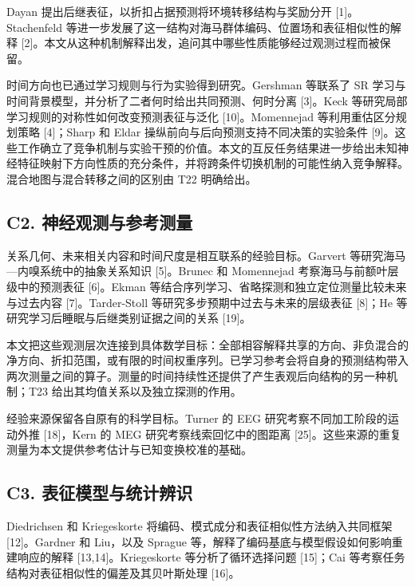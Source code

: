 \documentclass[11pt,a4paper]{article}
\begin{document}
Dayan 提出后继表征，以折扣占据预测将环境转移结构与奖励分开
{[}1{]}。Stachenfeld
等进一步发展了这一结构对海马群体编码、位置场和表征相似性的解释
{[}2{]}。本文从这种机制解释出发，追问其中哪些性质能够经过观测过程而被保留。

时间方向也已通过学习规则与行为实验得到研究。Gershman 等联系了 SR
学习与时间背景模型，并分析了二者何时给出共同预测、何时分离 {[}3{]}。Keck
等研究局部学习规则的对称性如何改变预测表征与泛化 {[}10{]}。Momennejad
等利用重估区分规划策略 {[}4{]}；Sharp 和 Eldar
操纵前向与后向预测支持不同决策的实验条件
{[}9{]}。这些工作确立了竞争机制与实验干预的价值。本文的互反任务结果进一步给出未知神经特征映射下方向性质的充分条件，并将跨条件切换机制的可能性纳入竞争解释。混合地图与混合转移之间的区别由
T22 明确给出。

\subsection{C2.
神经观测与参考测量}\label{c2.-ux795eux7ecfux89c2ux6d4bux4e0eux53c2ux8003ux6d4bux91cf}

关系几何、未来相关内容和时间尺度是相互联系的经验目标。Garvert
等研究海马—内嗅系统中的抽象关系知识 {[}5{]}。Brunec 和 Momennejad
考察海马与前额叶层级中的预测表征 {[}6{]}。Ekman
等结合序列学习、省略探测和独立定位测量比较未来与过去内容
{[}7{]}。Tarder-Stoll 等研究多步预期中过去与未来的层级表征 {[}8{]}；He
等研究学习后睡眠与后继类别证据之间的关系 {[}19{]}。

本文把这些观测层次连接到具体数学目标：全部相容解释共享的方向、非负混合的净方向、折扣范围，或有限的时间权重序列。已学习参考会将自身的预测结构带入两次测量之间的算子。测量的时间持续性还提供了产生表观后向结构的另一种机制；T23
给出其均值关系以及独立探测的作用。

经验来源保留各自原有的科学目标。Turner 的 EEG
研究考察不同加工阶段的运动外推 {[}18{]}，Kern 的 MEG
研究考察线索回忆中的图距离
{[}25{]}。这些来源的重复测量为本文提供参考估计与已知变换校准的基础。

\subsection{C3.
表征模型与统计辨识}\label{c3.-ux8868ux5f81ux6a21ux578bux4e0eux7edfux8ba1ux8fa8ux8bc6}

Diedrichsen 和 Kriegeskorte 将编码、模式成分和表征相似性方法纳入共同框架
{[}12{]}。Gardner 和 Liu，以及 Sprague
等，解释了编码基底与模型假设如何影响重建响应的解释
{[}13,14{]}。Kriegeskorte 等分析了循环选择问题 {[}15{]}；Cai
等考察任务结构对表征相似性的偏差及其贝叶斯处理 {[}16{]}。
\end{document}
